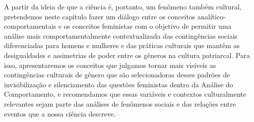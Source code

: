 A partir da ideia de que a ciência é, portanto, um fenômeno também cultural, pretendemos neste capítulo fazer um diálogo entre os conceitos analítico-comportamentais e os conceitos feministas com o objetivo de permitir uma análise mais comportamentalmente contextualizada das contingências sociais diferenciadas para homens e mulheres e das práticas culturais que mantêm as desigualdades e assimetrias de poder entre os gêneros na cultura patriarcal. Para isso, apresentaremos os conceitos que julgamos tornar mais visíveis as contingências culturais de gênero que são selecionadoras desses padrões de invisibilização e silenciamento das questões feministas dentro da Análise do Comportamento, e recomendamos que essas variáveis e contextos culturalmente relevantes sejam parte das análises de fenômenos sociais e das relações entre eventos que a nossa ciência descreve.

